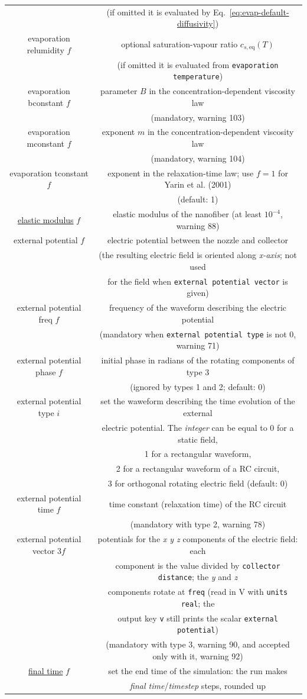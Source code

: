 \begin{longtable}{cc}
 & (if omitted it is evaluated by Eq.~\ref{eq:evap-default-diffusivity})\tabularnewline
evaporation relumidity $f$  & optional saturation-vapour ratio $c_{s,\mathrm{eq}}(T)$\tabularnewline
 & (if omitted it is evaluated from \texttt{evaporation temperature})\tabularnewline
evaporation bconstant $f$  & parameter $B$ in the concentration-dependent viscosity law\tabularnewline
 & (mandatory, warning 103)\tabularnewline
evaporation mconstant $f$  & exponent $m$ in the concentration-dependent viscosity law\tabularnewline
 & (mandatory, warning 104)\tabularnewline
evaporation tconstant $f$  & exponent in the relaxation-time law; use $f=1$ for Yarin et al. (2001)\tabularnewline
 & (default: 1)\tabularnewline
\uline{elastic modulus} $f$  & elastic modulus of the nanofiber (at least $10^{-4}$, warning 88)\tabularnewline
external potential $f$  & electric potential between the nozzle and collector\tabularnewline
 & (the resulting electric field is oriented along \textit{x-axis}; not used\tabularnewline
 & for the field when \texttt{external potential vector} is given)\tabularnewline
external potential freq $f$  & frequency of the waveform describing the electric potential\tabularnewline
 & (mandatory when \texttt{external potential type} is not 0, warning 71)\tabularnewline
external potential phase $f$  & initial phase in radians of the rotating components of type 3\tabularnewline
 & (ignored by types 1 and 2; default: 0)\tabularnewline
external potential type $i$  & set the waweform describing the time evolution of the external\tabularnewline
 & electric potential. The \textit{integer} can be equal to 0 for a static
field,\tabularnewline
 & 1 for a rectangular waveform, \tabularnewline
 & 2 for a rectangular waveform of a RC circuit,\tabularnewline
 & 3 for orthogonal rotating electric field (default: 0)\tabularnewline
external potential time $f$  & time constant (relaxation time) of the RC circuit\tabularnewline
 & (mandatory with type 2, warning 78)\tabularnewline
external potential vector $3f$  & potentials for the \textit{x y z} components of the electric field: each\tabularnewline
 & component is the value divided by \texttt{collector distance}; the \textit{y} and \textit{z}\tabularnewline
 & components rotate at \texttt{freq} (read in V with \texttt{units real}; the\tabularnewline
 & output key \texttt{v} still prints the scalar \texttt{external potential})\tabularnewline
 & (mandatory with type 3, warning 90, and accepted only with it, warning 92)\tabularnewline
\uline{final time} $f$  & set the end time of the simulation: the run makes\tabularnewline
 & \textit{final time}/\textit{timestep} steps, rounded up\tabularnewline

\end{longtable}
